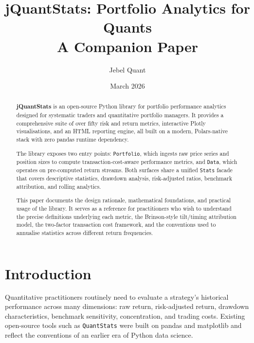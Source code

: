 \documentclass[11pt,a4paper]{article}
\begin{document}
\title{%
  \textbf{jQuantStats: Portfolio Analytics for Quants}\\[0.4em]
  {\large A Companion Paper}
}
\author{Jebel Quant}
\date{March 2026}

\maketitle

\begin{abstract}
\noindent
\textbf{jQuantStats} is an open-source Python library for portfolio performance
analytics designed for systematic traders and quantitative portfolio managers.
It provides a comprehensive suite of over fifty risk and return metrics,
interactive Plotly visualisations, and an HTML reporting engine, all built on a
modern, Polars-native stack with zero pandas runtime dependency.

The library exposes two entry points: \texttt{Portfolio}, which ingests raw
price series and position sizes to compute transaction-cost-aware performance
metrics, and \texttt{Data}, which operates on pre-computed return streams.
Both surfaces share a unified \texttt{Stats} facade that covers descriptive
statistics, drawdown analysis, risk-adjusted ratios, benchmark attribution, and
rolling analytics.

This paper documents the design rationale, mathematical foundations, and
practical usage of the library.  It serves as a reference for practitioners who
wish to understand the precise definitions underlying each metric, the
Brinson-style tilt/timing attribution model, the two-factor transaction cost
framework, and the conventions used to annualise statistics across different
return frequencies.
\end{abstract}

\tableofcontents
\newpage

\section{Introduction}
\label{sec:intro}

Quantitative practitioners routinely need to evaluate a strategy's historical
performance across many dimensions: raw return, risk-adjusted return, drawdown
characteristics, benchmark sensitivity, concentration, and trading costs.
Existing open-source tools such as \texttt{QuantStats} \citep{quantstats2019}
were built on pandas and matplotlib and reflect the conventions of an earlier
era of Python data science.
\end{document}
